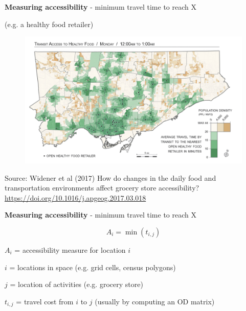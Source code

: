 \documentclass[aspectratio=169]{beamer}
\begin{document}
\begin{frame}
	
	\textbf{Measuring accessibility} - minimum travel time to reach X 
	
	(e.g. a healthy food retailer)
		
	\begin{figure}
		\centering
		\includegraphics[width=0.86\linewidth]{images/food_midnight.png}
	\end{figure}

	\tiny Source: Widener et al (2017) How do changes in the daily food and transportation environments affect grocery store accessibility? \url{https://doi.org/10.1016/j.apgeog.2017.03.018}
	
\end{frame}



\begin{frame}
	
	\textbf{Measuring accessibility} - minimum travel time to reach X
	
	\vspace{4mm}
	
	\[A_i = \min (t_{i,j})
	\]
	
	\vspace{1mm}
		
	$A_i$ = accessibility measure for location $i$
	
	\vspace{1mm}
	
	$i$ = locations in space (e.g. grid cells, census polygons)
	
	\vspace{1mm}
	
	$j$ = location of activities (e.g. grocery store)
	
	\vspace{1mm}
	
	$t_{i,j}$ = travel cost from $i$ to $j$ (usually by computing an OD matrix)
	
\end{frame}
\end{document}
